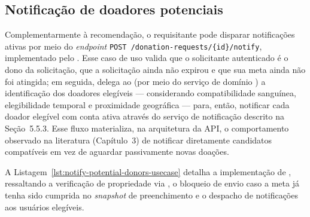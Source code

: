 \subsection{Notificação de doadores potenciais}

Complementarmente à recomendação, o requisitante pode disparar notificações ativas por meio do \textit{endpoint} \texttt{POST /donation-requests/\{id\}/notify}, implementado pelo . Esse caso de uso valida que o solicitante autenticado é o dono da solicitação, que a solicitação ainda não expirou e que sua meta ainda não foi atingida; em seguida, delega ao  (por meio do serviço de domínio ) a identificação dos doadores elegíveis --- considerando compatibilidade sanguínea, elegibilidade temporal e proximidade geográfica --- para, então, notificar cada doador elegível com conta ativa através do serviço de notificação descrito na Seção~5.5.3. Esse fluxo materializa, na arquitetura da API, o comportamento observado na literatura (Capítulo~3) de notificar diretamente candidatos compatíveis em vez de aguardar passivamente novas doações.

A Listagem~\ref{lst:notify-potential-donors-usecase} detalha a implementação de , ressaltando a verificação de propriedade via , o bloqueio de envio caso a meta já tenha sido cumprida no \textit{snapshot} de preenchimento e o despacho de notificações aos usuários elegíveis.

